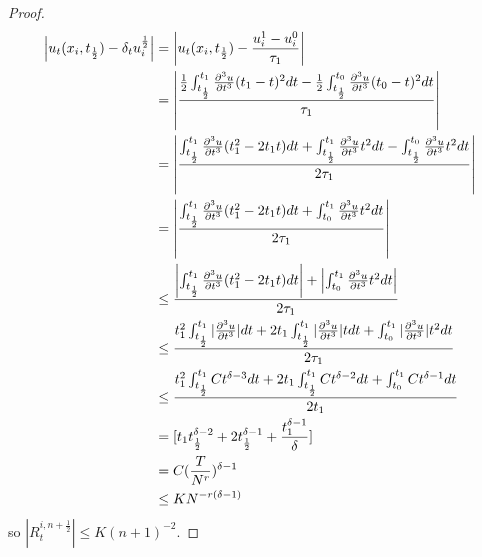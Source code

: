 \documentclass[10pt, reqno]{amsart}
\theoremstyle{remark}
\theoremstyle{definition}
\numberwithin{table}{section}
\begin{document}
\begin{proof}
\begin{align}
\left|u_t(x_i, t_{\frac{1}{2}})-\delta_tu_i^{\frac{1}{2}}\right| & =\left|u_t(x_i, t_{\frac{1}{2}})-\frac{u_i^{1}-u_i^0}{\tau_{1}}\right| \notag\\
& =\left|\frac{\frac{1}{2}\int_{t_{\frac{1}{2}}}^{t_{1}}\frac{\partial^3 u}{\partial t^3}(t_{1}-t)^2dt-\frac{1}{2}\int_{t_{\frac{1}{2}}}^{t_{0}}\frac{\partial^3 u}{\partial t^3}(t_{0}-t)^2dt}{\tau_{1}}\right| \notag\\
&=\left|\frac{\int_{t_{\frac{1}{2}}}^{t_{1}}\frac{\partial^3 u}{\partial t^3}(t_{1}^2-2t_1t)dt+\int_{t_{\frac{1}{2}}}^{t_{1}}\frac{\partial^3 u}{\partial t^3}t^2dt-\int_{t_{\frac{1}{2}}}^{t_{0}}\frac{\partial^3 u}{\partial t^3}t^2dt}{2\tau_{1}}\right| \notag\\
&=\left|\frac{\int_{t_{\frac{1}{2}}}^{t_{1}}\frac{\partial^3 u}{\partial t^3}(t_{1}^2-2t_1t)dt+\int_{t_{0}}^{t_{1}}\frac{\partial^3 u}{\partial t^3}t^2dt}{2\tau_{1}}\right| \notag\\
&\leq \frac{\left|\int_{t_{\frac{1}{2}}}^{t_{1}}\frac{\partial^3 u}{\partial t^3}(t_{1}^2-2t_1t)dt\right|+\left|\int_{t_{0}}^{t_{1}}\frac{\partial^3 u}{\partial t^3}t^2dt\right|}{2\tau_{1}} \notag\\
&\leq \frac{t_1^2\int_{t_{\frac{1}{2}}}^{t_{1}}|\frac{\partial^3 u}{\partial t^3}|dt+2t_1\int_{t_{\frac{1}{2}}}^{t_{1}}|\frac{\partial^3 u}{\partial t^3}|tdt+\int_{t_{0}}^{t_{1}}|\frac{\partial^3 u}{\partial t^3}|t^2dt}{2\tau_1}\notag\\
&\leq \frac{t_1^2\int_{t_{\frac{1}{2}}}^{t_{1}}Ct^{\delta-3}dt+2t_1\int_{t_{\frac{1}{2}}}^{t_{1}}Ct^{\delta-2}dt+\int_{t_{0}}^{t_{1}}Ct^{\delta-1}dt}{2t_1}\notag\\
&=[t_1t_{\frac{1}{2}}^{\delta-2}+2t_{\frac{1}{2}}^{\delta-1}+\frac{t_1^{\delta-1}}{\delta}]\notag\\
&= C(\frac{T}{N^r})^{\delta-1}\notag\\
&\leq KN^{-r(\delta-1)}\notag
\end{align}
so $|R_t^{i, n+\frac{1}{2}}|\leq K(n+1)^{-2}$. 


\end{proof}
\end{document}
